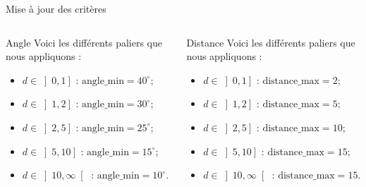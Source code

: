 \begin{frame}{Mise à jour des critères}
    \begin{columns}
        \begin{column}{0.4\paperwidth}
            \begin{block}{Angle}
                Voici les différents paliers que nous appliquons :
                \begin{itemize}
                    \item $d\in\left]0, 1\right]$ : $\text{angle\_min}=40^\circ$;
                    \item $d\in\left]1, 2\right]$ : $\text{angle\_min}=30^\circ$;
                    \item $d\in\left]2, 5\right]$ : $\text{angle\_min}=25^\circ$;
                    \item $d\in\left]5, 10\right]$ : $\text{angle\_min}=15^\circ$;
                    \item $d\in\left]10, \infty\right[$ : $\text{angle\_min}=10^\circ$.
                \end{itemize}
            \end{block}
        \end{column}
        \begin{column}{0.4\paperwidth}
            \begin{block}{Distance}
                Voici les différents paliers que nous appliquons :
                \begin{itemize}
                    \item $d\in\left]0, 1\right]$ : $\text{distance\_max}=2$;
                    \item $d\in\left]1, 2\right]$ : $\text{distance\_max}=5$;
                    \item $d\in\left]2, 5\right]$ : $\text{distance\_max}=10$;
                    \item $d\in\left]5, 10\right]$ : $\text{distance\_max}=15$;
                    \item $d\in\left]10, \infty\right[$ : $\text{distance\_max}=15$.
                \end{itemize}
            \end{block}
        \end{column}
    \end{columns}
\end{frame}